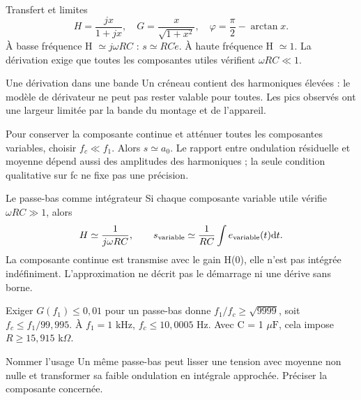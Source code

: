 \begin{loi}{Transfert et limites}
\[H=\frac{jx}{1+jx},\quad G=\frac{x}{\sqrt{1+x^2}},\quad\varphi=\frac\pi2-\arctan x.\]À basse fréquence H $\simeq j\omega RC$ : $s\simeq RC\dot e$. À haute fréquence H $\simeq1$. La dérivation exige que toutes les composantes utiles vérifient $\omega RC\ll1$.
\end{loi}
\begin{piege}{Une dérivation dans une bande}
Un créneau contient des harmoniques élevées : le modèle de dérivateur ne peut pas rester valable pour toutes. Les pics observés ont une largeur limitée par la bande du montage et de l’appareil.
\end{piege}


Pour conserver la composante continue et atténuer toutes les composantes variables, choisir $f_c\ll f_1$. Alors $s\simeq a_0$. Le rapport entre ondulation résiduelle et moyenne dépend aussi des amplitudes des harmoniques ; la seule condition qualitative sur fc ne fixe pas une précision.
\begin{loi}{Le passe-bas comme intégrateur}
Si chaque composante variable utile vérifie $\omega RC\gg1$, alors\[H\simeq\frac1{j\omega RC},\qquad s_{\rm variable}\simeq\frac1{RC}\int e_{\rm variable}(t)\mathrm{d} t.\]La composante continue est transmise avec le gain H(0), elle n’est pas intégrée indéfiniment. L’approximation ne décrit pas le démarrage ni une dérive sans borne.
\end{loi}
Exiger $G(f_1)\leq0{,}01$ pour un passe-bas donne $f_1/f_c\geq\sqrt{9999}$, soit $f_c\leq f_1/99{,}995$. À $f_1=1$ kHz, $f_c\leq10{,}0005$ Hz. Avec C = 1 $\mu\mathrm F$, cela impose $R\geq15{,}915$ k$\Omega$.
\begin{methode}{Nommer l’usage}
Un même passe-bas peut lisser une tension avec moyenne non nulle et transformer sa faible ondulation en intégrale approchée. Préciser la composante concernée.
\end{methode}


